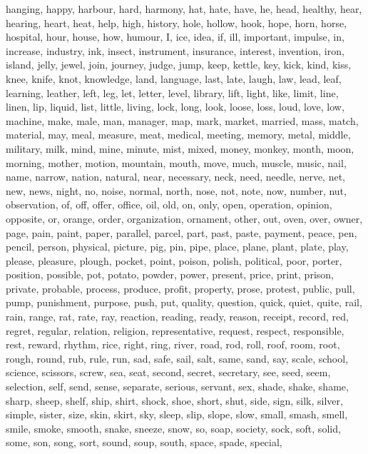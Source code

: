 hanging, happy, harbour, hard, harmony, hat, hate, have, he, head, healthy,
hear, hearing, heart, heat, help, high, history, hole, hollow, hook, hope,
horn, horse, hospital, hour, house, how, humour, I, ice, idea, if, ill,
important, impulse, in, increase, industry, ink, insect, instrument,
insurance, interest, invention, iron, island, jelly, jewel, join, journey,
judge, jump, keep, kettle, key, kick, kind, kiss, knee, knife, knot,
knowledge, land, language, last, late, laugh, law, lead, leaf, learning,
leather, left, leg, let, letter, level, library, lift, light, like, limit,
line, linen, lip, liquid, list, little, living, lock, long, look, loose, loss,
loud, love, low, machine, make, male, man, manager, map, mark, market,
married, mass, match, material, may, meal, measure, meat, medical, meeting,
memory, metal, middle, military, milk, mind, mine, minute, mist, mixed, money,
monkey, month, moon, morning, mother, motion, mountain, mouth, move, much,
muscle, music, nail, name, narrow, nation, natural, near, necessary, neck,
need, needle, nerve, net, new, news, night, no, noise, normal, north, nose,
not, note, now, number, nut, observation, of, off, offer, office, oil, old,
on, only, open, operation, opinion, opposite, or, orange, order, organization,
ornament, other, out, oven, over, owner, page, pain, paint, paper, parallel,
parcel, part, past, paste, payment, peace, pen, pencil, person, physical,
picture, pig, pin, pipe, place, plane, plant, plate, play, please, pleasure,
plough, pocket, point, poison, polish, political, poor, porter, position,
possible, pot, potato, powder, power, present, price, print, prison, private,
probable, process, produce, profit, property, prose, protest, public, pull,
pump, punishment, purpose, push, put, quality, question, quick, quiet, quite,
rail, rain, range, rat, rate, ray, reaction, reading, ready, reason, receipt,
record, red, regret, regular, relation, religion, representative, request,
respect, responsible, rest, reward, rhythm, rice, right, ring, river, road,
rod, roll, roof, room, root, rough, round, rub, rule, run, sad, safe, sail,
salt, same, sand, say, scale, school, science, scissors, screw, sea, seat,
second, secret, secretary, see, seed, seem, selection, self, send, sense,
separate, serious, servant, sex, shade, shake, shame, sharp, sheep, shelf,
ship, shirt, shock, shoe, short, shut, side, sign, silk, silver, simple,
sister, size, skin, skirt, sky, sleep, slip, slope, slow, small, smash, smell,
smile, smoke, smooth, snake, sneeze, snow, so, soap, society, sock, soft,
solid, some, son, song, sort, sound, soup, south, space, spade, special,
